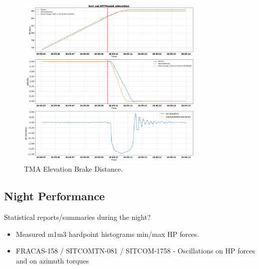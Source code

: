 \begin{figure}
    \centering
    \includegraphics[width=0.8\textwidth]{spa/20_vel_acc_jerk/BLOCK-T240_el_brake_tests.png}
    \caption{TMA Elevation Brake Distance.}
    \label{fig:block240_elevation_brake_distance}
    \end{figure}

\subsection{Night Performance}

Statistical reports/summaries during the night?
\begin{itemize}
    \item Measured m1m3 hardpoint histograms min/max HP forces.
    \item FRACAS-158 / SITCOMTN-081 / SITCOM-1758 - Oscillations on HP forces and on azimuth torques
\end{itemize}
